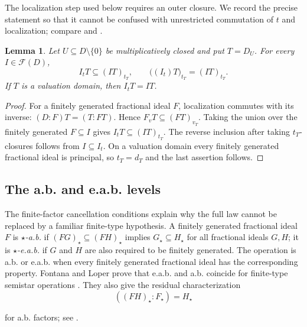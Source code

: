 \documentclass[11pt]{amsart}
\newtheorem{lemma}[lemma]{Lemma}
\theoremstyle{definition}
\theoremstyle{remark}
\newcommand{\Fcal}{\mathcal F}
\begin{document}
The localization step used below requires an outer closure.  We record the
precise statement so that it cannot be confused with unrestricted
commutation of $t$ and localization; compare \cite[Section~2]{HoustonKabbajMimouni} and \cite[Lemma~3.4]{Kang}.

\begin{lemma}\label{lem:t-localization}
Let $U\subseteq D\setminus\{0\}$ be multiplicatively closed and put
$T=D_U$.  For every $I\in\Fcal(D)$,
\begin{equation}\label{eq:t-localization}
 I_tT\subseteq(IT)_{t_T},\qquad
 \bigl((I_t)T\bigr)_{t_T}=(IT)_{t_T}.
\end{equation}
If $T$ is a valuation domain, then $I_tT=IT$.
\end{lemma}

\begin{proof}
For a finitely generated fractional ideal $F$, localization commutes with
its inverse: $(D:F)T=(T:FT)$.  Hence $F_vT\subseteq(FT)_{v_T}$.
Taking the union over the finitely generated $F\subseteq I$ gives
$I_tT\subseteq(IT)_{t_T}$.  The reverse inclusion after taking
$t_T$-closures follows from $I\subseteq I_t$.  On a valuation domain every
finitely generated fractional ideal is principal, so $t_T=d_T$ and the
last assertion follows.
\end{proof}

\subsection{The a.b. and e.a.b. levels}

The finite-factor cancellation conditions explain why the full law cannot be
replaced by a familiar finite-type hypothesis.  A finitely generated
fractional ideal $F$ is \emph{$\star$-a.b.} if
$(FG)_\star\subseteq(FH)_\star$ implies $G_\star\subseteq H_\star$ for all
fractional ideals $G,H$; it is \emph{$\star$-e.a.b.} if $G$ and $H$ are also
required to be finitely generated.  The operation is a.b. or e.a.b. when
every finitely generated fractional ideal has the corresponding property.
Fontana and Loper prove that e.a.b. and a.b. coincide for finite-type semistar
operations \cite[Lemma~3 and Proposition~4]{FontanaLoper}.  They also give
the residual characterization
\begin{equation}\label{eq:FL-residual}
 ((FH)_\star:F_\star)=H_\star
\end{equation}

for a.b. factors; see \cite[Lemma~8]{FontanaLoper}.
\end{document}
